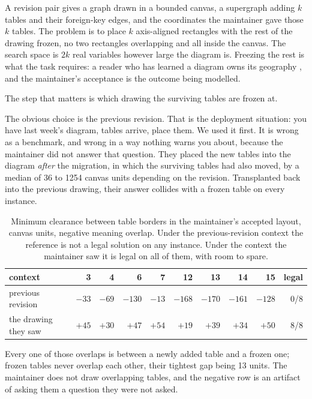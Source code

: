 \documentclass[11pt]{article}
\begin{document}
A revision pair gives a graph drawn in a bounded canvas, a supergraph adding $k$ tables and
their foreign-key edges, and the coordinates the maintainer gave those $k$ tables. The problem is
to place $k$ axis-aligned rectangles with the rest of the drawing frozen, no two rectangles
overlapping and all inside the canvas. The search space is $2k$ real variables however large the
diagram is. Freezing the rest is what the task requires: a reader who has learned a diagram owns
its geography \cite{misue95}, and the maintainer's acceptance is the outcome being modelled.

The step that matters is which drawing the surviving tables are frozen at.

The obvious choice is the previous revision. That is the deployment situation: you have last
week's diagram, tables arrive, place them. We used it first. It is wrong as a benchmark, and
wrong in a way nothing warns you about, because the maintainer did not answer that question.
They placed the new tables into the diagram \emph{after} the migration, in which the surviving
tables had also moved, by a median of 36 to 1254 canvas units depending on the revision.
Transplanted back into the previous drawing, their answer collides with a frozen table on every
instance.

\begin{table}[h]
\centering
\caption{Minimum clearance between table borders in the maintainer's accepted layout, canvas
units, negative meaning overlap. Under the previous-revision context the reference is not a
legal solution on any instance. Under the context the maintainer saw it is legal on all of them,
with room to spare.}
\label{tab:build}
\begin{tabular}{lrrrrrrrrr}
\toprule
context & 3 & 4 & 6 & 7 & 12 & 13 & 14 & 15 & legal \\
\midrule
previous revision    & $-33$ & $-69$ & $-130$ & $-13$ & $-168$ & $-170$ & $-161$ & $-128$ & 0/8 \\
the drawing they saw & $+45$ & $+30$ & $+47$  & $+54$ & $+19$  & $+39$  & $+34$  & $+50$  & 8/8 \\
\bottomrule
\end{tabular}
\end{table}

Every one of those overlaps is between a newly added table and a frozen one; frozen tables never
overlap each other, their tightest gap being 13 units. The maintainer does not draw overlapping
tables, and the negative row is an artifact of asking them a question they were not asked.
\end{document}
